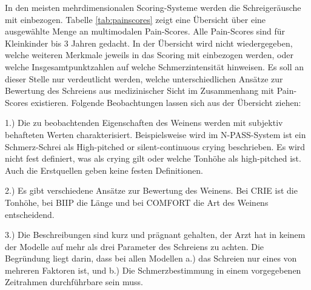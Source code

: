 In den meisten mehrdimensionalen Scoring-Systeme werden die Schreigeräusche mit einbezogen. Tabelle \ref{tab:painscores} zeigt eine Übersicht über eine ausgewählte Menge an multimodalen Pain-Scores. Alle Pain-Scores sind für Kleinkinder bis 3 Jahren gedacht. In der Übersicht wird nicht wiedergegeben, welche weiteren Merkmale jeweils in das Scoring mit einbezogen werden, oder welche Insgesamtpunktzahlen auf welche Schmerzintensität hinweisen. Es soll an dieser Stelle nur verdeutlicht werden, welche unterschiedlichen Ansätze zur Bewertung des Schreiens aus medizinischer Sicht im Zusammenhang mit Pain-Scores existieren. Folgende Beobachtungen lassen sich aus der Übersicht ziehen:

1.) Die zu beobachtenden Eigenschaften des Weinens werden mit subjektiv behafteten Werten charakterisiert. Beispielsweise wird im N-PASS-System ist ein Schmerz-Schrei als \glqq High-pitched or silent-continuous crying\grqq{} beschrieben. Es wird nicht fest definiert, was als \glqq crying\grqq{} gilt oder welche Tonhöhe als \glqq high-pitched\grqq{} ist. Auch die Erstquellen geben keine festen Definitionen.

2.) Es gibt verschiedene Ansätze zur Bewertung des Weinens. Bei CRIE ist die Tonhöhe, bei BIIP die Länge und bei COMFORT die Art des Weinens entscheidend.

3.) Die Beschreibungen sind kurz und prägnant gehalten, der Arzt hat in keinem der Modelle auf mehr als drei Parameter des Schreiens zu achten. Die Begründung liegt darin, dass bei allen Modellen a.) das Schreien nur eines von mehreren Faktoren ist, und b.) Die Schmerzbestimmung in einem vorgegebenen Zeitrahmen durchführbare sein muss.

